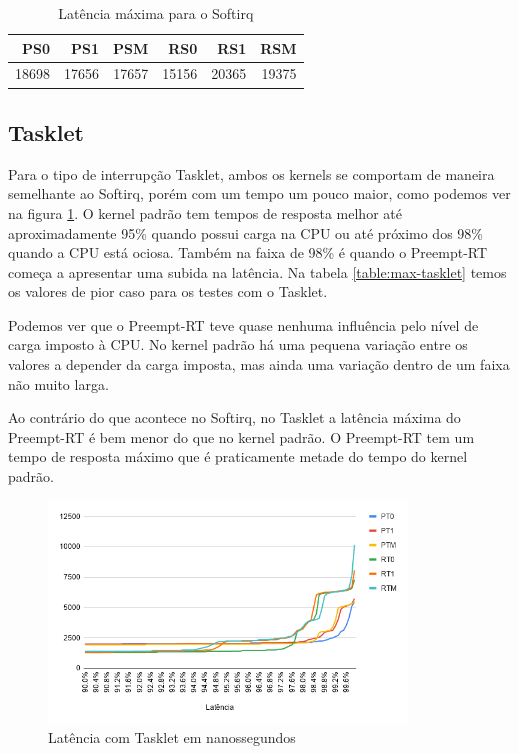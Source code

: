 \begin{table}[!htb]
    \centering
    \begin{center}
        \begin{tabular}{|r|r|r|r|r|r|}
            \toprule
                PS0 &    PS1 &    PSM &    RS0 &     RS1 &    RSM \\
            \midrule
                18698 &  17656 &  17657 & 15156 &  20365 &  19375 \\
            \bottomrule
        \end{tabular}
    \end{center}
    \caption{Latência máxima para o Softirq}
    \label{table:max-softirq}
\end{table}


\subsection{Tasklet}

Para o tipo de interrupção Tasklet, ambos os kernels se comportam de maneira semelhante ao Softirq, porém com um tempo um pouco maior, como podemos ver na figura \ref{grafico:tasklet}. O kernel padrão tem tempos de resposta melhor até aproximadamente 95\% quando possui carga na CPU ou até próximo dos 98\% quando a CPU está ociosa. Também na faixa de 98\% é quando o Preempt-RT começa a apresentar uma subida na latência. Na tabela \ref{table:max-tasklet} temos os valores de pior caso para os testes com o Tasklet.

Podemos ver que o Preempt-RT teve quase nenhuma influência pelo nível de carga imposto à CPU. No kernel padrão há uma pequena variação entre os valores a depender da carga imposta, mas ainda uma variação dentro de um faixa não muito larga.

Ao contrário do que acontece no Softirq, no Tasklet a latência máxima do Preempt-RT é bem menor do que no kernel padrão. O Preempt-RT tem um tempo de resposta máximo que é praticamente metade do tempo do kernel padrão.

\begin{figure}[!htb]
    \centering
    \includegraphics[width=0.85\textwidth]{graficos/tasklet.png}
    \caption{Latência com Tasklet em nanossegundos}
    \label{grafico:tasklet}
\end{figure}

